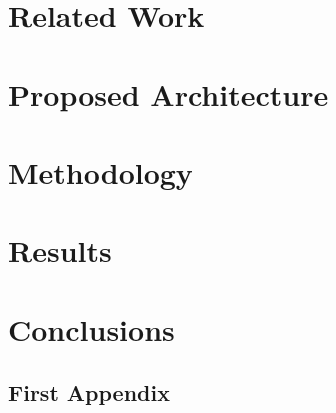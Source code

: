 \documentclass[pdftex]{pucthesis}	%
\begin{document}
\chapter[RELATED WORK]{Related Work} \label{work}


\chapter[PROPOSED ARCHITECTURE]{Proposed Architecture} \label{arch}


\chapter[METHODOLOGY]{Methodology} \label{work}


\chapter[RESULTS]{Results} \label{work}


\chapter[CONCLUSIONS]{Conclusions}



\cleardoublepage
{} \label{references}

\renewcommand{\bibname}{REFERENCES}






\appendix %

\newpage
\section[First Appendix]{First Appendix}

\end{document}
